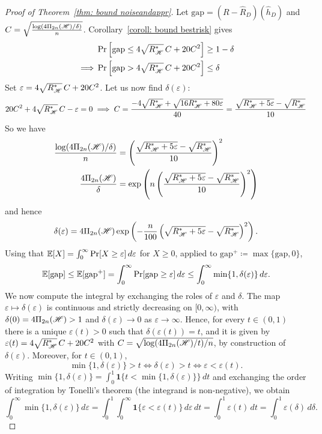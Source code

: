 \documentclass[reqno]{amsart}
\begin{document}
\begin{theorem}
\begin{proof}[Proof of Theorem~\ref{thm: bound noiseandappr}]
    Let $\text{gap} = (R-\hat R_D)(\hat h_D)$ and $C = \sqrt{\frac{\log(4 \Pi_{2n}(\mathscr{H})/\delta)}{n}}$. Corollary~\ref{coroll: bound bestrisk} gives
\begin{align*}
&\Pr\left[\text{gap} \le 4\sqrt{R^*_{\mathscr{H}}}\,C + 20C^2\right] \ge 1-\delta \\
\implies &\Pr\left[\text{gap} > 4\sqrt{R^*_{\mathscr{H}}}\,C + 20C^2\right] \le \delta
\end{align*}
Set $\varepsilon = 4\sqrt{R^*_{\mathscr{H}}}\,C + 20C^2$. Let us now find $\delta(\varepsilon)$:
\[
20C^2 + 4\sqrt{R^*_{\mathscr{H}}}\,C - \varepsilon = 0 \implies C = \frac{-4\sqrt{R^*_{\mathscr{H}}} + \sqrt{16R^*_{\mathscr{H}} + 80\varepsilon}}{40} = \frac{\sqrt{R^*_{\mathscr{H}} + 5\varepsilon} - \sqrt{R^*_{\mathscr{H}}}}{10}
\]
So we have
\begin{align*}
\frac{\log(4\Pi_{2n}(\mathscr{H})/\delta)}{n} &= \left(\frac{\sqrt{R^*_{\mathscr{H}} + 5\varepsilon} - \sqrt{R^*_{\mathscr{H}}}}{10}\right)^2 \\
\frac{4\Pi_{2n}(\mathscr{H})}{\delta} &= \exp\left(n\left(\frac{\sqrt{R^*_{\mathscr{H}} + 5\varepsilon} - \sqrt{R^*_{\mathscr{H}}}}{10}\right)^2\right)
\end{align*}
and hence
\[
\delta(\varepsilon) = 4\Pi_{2n}(\mathscr{H})\exp\left(-\frac{n}{100}\left(\sqrt{R^*_{\mathscr{H}} + 5\varepsilon} - \sqrt{R^*_{\mathscr{H}}}\right)^2\right).
\]
Using that $\mathbb{E}[X] = \int_0^\infty \Pr[X \ge \varepsilon]\,d\varepsilon$ for $X \ge 0$, applied to $\text{gap}^+ \coloneq \max\{\text{gap}, 0\}$,
\[
\mathbb{E}[\text{gap}] \le \mathbb{E}[\text{gap}^+] = \int_0^\infty \Pr[\text{gap} \ge \varepsilon]\,d\varepsilon \le \int_0^\infty \min\{1, \delta(\varepsilon)\}\,d\varepsilon.
\]
We now compute the integral by exchanging the roles of $\varepsilon$ and $\delta$. The map $\varepsilon\mapsto\delta(\varepsilon)$ is continuous and strictly decreasing on $[0,\infty)$, with $\delta(0) = 4\Pi_{2n}(\mathscr{H}) > 1$ and $\delta(\varepsilon)\to0$ as $\varepsilon\to\infty$. Hence, for every $t\in(0,1)$ there is a unique $\varepsilon(t)>0$ such that $\delta(\varepsilon(t)) = t$, and it is given by $\varepsilon(t) = 4\sqrt{R^*_{\mathscr{H}}}\,C + 20C^2$ with $C = \sqrt{\log(4\Pi_{2n}(\mathscr{H})/t)/n}$, by construction of $\delta(\varepsilon)$. Moreover, for $t\in(0,1)$,
\[
\min\{1,\delta(\varepsilon)\} > t \iff \delta(\varepsilon) > t \iff \varepsilon < \varepsilon(t).
\]
Writing $\min\{1,\delta(\varepsilon)\} = \int_0^1 \mathbf 1\{t < \min\{1,\delta(\varepsilon)\}\}\,dt$ and exchanging the order of integration by Tonelli's theorem (the integrand is non-negative), we obtain
\[
\int_0^\infty \min\{1, \delta(\varepsilon)\}\,d\varepsilon = \int_0^1 \int_0^\infty \mathbf 1\{\varepsilon < \varepsilon(t)\}\,d\varepsilon\,dt = \int_0^1 \varepsilon(t)\,dt = \int_0^1 \varepsilon(\delta)\,d\delta.
\]
\end{proof}
\end{theorem}
\end{document}
